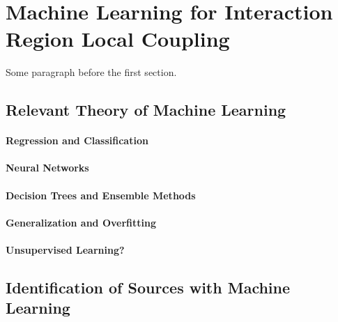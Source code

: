
\chapter{Machine Learning for Interaction Region Local Coupling} %

\label{Chapter4} %


Some paragraph before the first section.


\section{Relevant Theory of Machine Learning}

\subsubsection{Regression and Classification}

\subsubsection{Neural Networks}

\subsubsection{Decision Trees and Ensemble Methods}

\subsubsection{Generalization and Overfitting}

\subsubsection{Unsupervised Learning?}


\section{Identification of Sources with Machine Learning}

